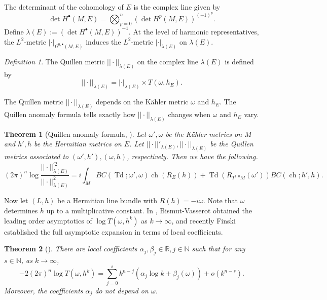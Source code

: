\documentclass[12pt,reqno,a4paper]{amsart}
\numberwithin{equation}{section}
\def\a{\alpha}
\def\b{\beta}
\DeclareMathOperator{\Td}{Td}
\DeclareMathOperator{\ch}{ch}
\newtheorem{thm}{{\sc Theorem}}[section]
\theoremstyle{remark}
\theoremstyle{dotless}
\newtheorem{definition}[theo]{{\sc Definition}}
\begin{document}
The determinant of the cohomology of $E$ is the complex line given by 
\begin{equation*}
\det H^{\bullet}(M,E)=\bigotimes_{p=0}^{n}(\det H^p(M,E))^{(-1)^p}.
\end{equation*}
Define $\lambda(E):=(\det H^{\bullet}(M,E))^{-1}$. At the level of harmonic representatives, the $L^2$-metric $|\cdot|_{\Omega^{0,\bullet}(M,E)}$ induces the $L^2$-metric $|\cdot|_{\lambda(E)}$ on $\lambda(E)$.
\begin{definition}
The Quillen metric $||\cdot||_{\lambda(E)}$ on the complex line $\lambda(E)$ is defined by 
\begin{equation*}
||\cdot||_{\lambda(E)}=|\cdot|_{\lambda(E)}\times T(\omega,h_E).
\end{equation*}
\end{definition}
The Quillen metric $||\cdot||_{\lambda(E)}$ depends on the K\"ahler metric $\omega$ and $h_E$. The Quillen anomaly formula tells exactly how $||\cdot||_{\lambda(E)}$ changes when $\omega$ and $h_E$ vary.

\begin{thm}[Quillen anomaly formula, ]
Let $\omega', \omega$ be the K\"ahler metrics on $M$ and $h', h$ be the Hermitian metrics on $E$. Let $||\cdot||'_{\lambda(E)}, ||\cdot||_{\lambda(E)}$ be the Quillen metrics associated to $(\omega',h'), (\omega,h)$, respectively. Then we have the following.
\begin{equation}\label{anomaly}
(2\pi)^n\log \frac{||\cdot||^{'2}_{\lambda(E)}}{||\cdot||^2_{\lambda(E)}}=i\int_M BC(\Td;\omega',\omega)\ch(R_E(h))+\Td(R_{T^{1,0}M}(\omega'))BC(\ch;h',h).
\end{equation}
\end{thm}

Now let $(L,h)$ be a Hermitian line bundle with $R(h)=-i\omega$. Note that $\omega$ determines $h$ up to a multiplicative constant. In \cite{vasserot1989asymptotics}, Bismut-Vasserot obtained the leading order asymptotics of $\log T(\omega,h^k)$ as $k\rightarrow\infty$, and recently Finski \cite{finski2018full} established the full asymptotic expansion in terms of local coefficients. 

\begin{thm}[]\label{Finski}
There are local coefficients $\a_j, \b_j\in\mathbb{R}, j\in\mathbb{N}$ such that for any $s\in\mathbb{N}$, as $k\rightarrow\infty$,
\begin{equation*}
-2(2\pi)^n\log T(\omega,h^k)=\sum_{j=0}^{s}k^{n-j}(\a_j\log k + \b_j(\omega)) + o(k^{n-s}).
\end{equation*}
Moreover, the coefficients $\a_j$ do not depend on $\omega$.
\end{thm}
\end{document}

